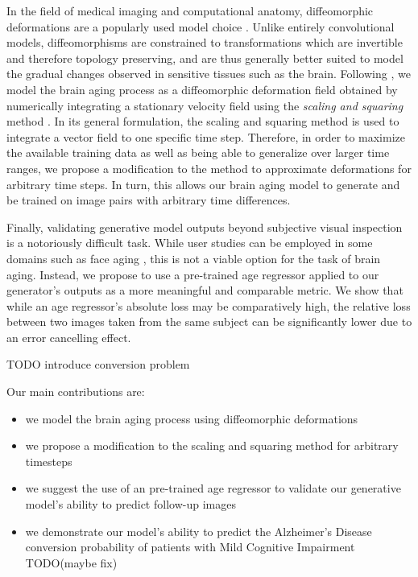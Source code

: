 In the field of medical imaging and computational anatomy, diffeomorphic deformations are a popularly used model choice \cite{beg2005computing} \cite{ashburner2007fast}. Unlike entirely convolutional models, diffeomorphisms are constrained to transformations which are invertible and therefore topology preserving, and are thus generally better suited to model the gradual changes observed in sensitive tissues such as the brain. Following \cite{dalca2018unsupervised}, we model the brain aging process as a diffeomorphic deformation field obtained by numerically integrating a stationary velocity field using the \textit{scaling and squaring} method \cite{arsigny2006log}. In its general formulation, the scaling and squaring method is used to integrate a vector field to one specific time step. Therefore, in order to maximize the available training data as well as being able to generalize over larger time ranges, we propose a modification to the method to approximate deformations for arbitrary time steps. In turn, this allows our brain aging model to generate and be trained on image pairs with arbitrary time differences. 

Finally, validating generative model outputs beyond subjective visual inspection is a notoriously difficult task. While user studies can be employed in some domains such as face aging \cite{palsson2018generative}, this is not a viable option for the task of brain aging. Instead, we propose to use a pre-trained age regressor applied to our generator's outputs as a more meaningful and comparable metric. We show that while an age regressor's absolute loss may be comparatively high, the relative loss between two images taken from the same subject can be significantly lower due to an error cancelling effect.

TODO introduce conversion problem

Our main contributions are:

\begin{itemize}
	\item we model the brain aging process using diffeomorphic deformations%
	\item we propose a modification to the scaling and squaring method for arbitrary timesteps
	\item we suggest the use of an pre-trained age regressor to validate our generative model's ability to predict follow-up images
	\item we demonstrate our model's ability to predict the Alzheimer's Disease conversion probability of patients with Mild Cognitive Impairment TODO(maybe fix)
\end{itemize}

